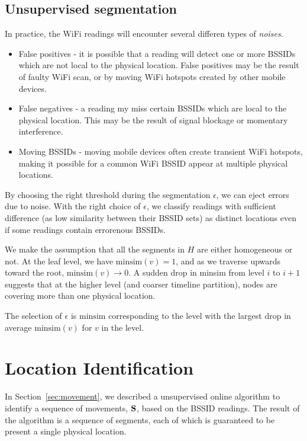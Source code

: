 \subsection{Unsupervised segmentation}

In practice, the WiFi readings will encounter several differen types of {\em
noises}.

\begin{itemize}
    \item False positives - it is possible that a reading will detect one or
        more BSSIDs which are not local to the physical location.  False
        positives may be the result of faulty WiFi scan, or by moving WiFi
        hotspots created by other mobile devices.
    \item False negatives - a reading my miss certain BSSIDs which are local to
        the physical location.  This may be the result of signal blockage or
        momentary interference.
    \item Moving BSSIDs - moving mobile devices often create transient WiFi
        hotspots, making it possible for a common WiFi BSSID appear at multiple
        physical locations.
\end{itemize}

By choosing the right threshold during the segmentation $\epsilon$, we can eject
errors due to noise.  With the right choice of
$\epsilon$, we classify readings with sufficient difference (as low similarity
between their BSSID sets) as distinct locations even if some readings contain
errorenous BSSIDs.

We make the assumption that all the segments in $H$ are either homogeneous or
not.  At the leaf level, we have $\mathrm{minsim}(v) = 1$, and as we traverse
upwards toward the root, $\mathrm{minsim}(v)\to 0$.  A sudden drop in minsim
from level $i$ to $i+1$ suggests that at the higher level (and coarser timeline
partition), nodes are covering more than one physical location.

The selection of $\epsilon$ is $\mathrm{minsim}$ corresponding to the level with
the largest drop in average $\mathrm{minsim}(v)$ for $v$ in the level.

\section{Location Identification}

In Section~\ref{sec:movement}, we described a unsupervised online algorithm to
identify a sequence of movements, $\mathbf{S}$, based on the BSSID readings.  The result of the
algorithm is a sequence of segments, each of which is guaranteed to be present a
single physical location.

